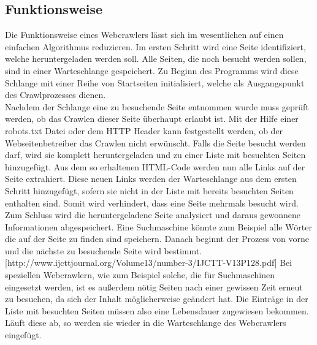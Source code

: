 \subsection{Funktionsweise}
Die Funktionsweise eines Webcrawlers lässt sich im wesentlichen auf einen einfachen Algorithmus reduzieren. Im ersten Schritt wird eine Seite identifiziert, welche heruntergeladen werden soll. Alle Seiten, die noch besucht werden sollen, sind in einer Warteschlange gespeichert. Zu Beginn des Programms wird diese Schlange mit einer Reihe von Startseiten initialisiert, welche als Ausgangspunkt des Crawlprozesses dienen.\\
Nachdem der Schlange eine zu besuchende Seite entnommen wurde muss geprüft werden, ob das Crawlen dieser Seite überhaupt erlaubt ist. Mit der Hilfe einer robots.txt Datei oder dem HTTP Header kann festgestellt werden, ob der Webseitenbetreiber das Crawlen nicht erwünscht.
Falls die Seite besucht werden darf, wird sie komplett heruntergeladen und zu einer Liste mit besuchten Seiten hinzugefügt. Aus dem so erhaltenen HTML-Code werden nun alle Links auf der Seite extrahiert. Diese neuen Links werden der Warteschlange aus dem ersten Schritt hinzugefügt, sofern sie nicht in der Liste mit bereits besuchten Seiten enthalten sind. Somit wird verhindert, dass eine Seite mehrmals besucht wird. \\
Zum Schluss wird die heruntergeladene Seite analysiert und daraus gewonnene Informationen abgespeichert. Eine Suchmaschine könnte zum Beispiel alle Wörter die auf der Seite zu finden sind speichern. Danach beginnt der Prozess von vorne und die nächste zu besuchende Seite wird bestimmt. [http://www.ijcttjournal.org/Volume13/number-3/IJCTT-V13P128.pdf]
Bei speziellen Webcrawlern, wie zum Beispiel solche, die für Suchmaschinen eingesetzt werden, ist es außerdem nötig Seiten nach einer gewissen Zeit erneut zu besuchen, da sich der Inhalt möglicherweise geändert hat. Die Einträge in der Liste mit besuchten Seiten müssen also eine Lebensdauer zugewiesen bekommen. Läuft diese ab, so werden sie wieder in die Warteschlange des Webcrawlers eingefügt.
